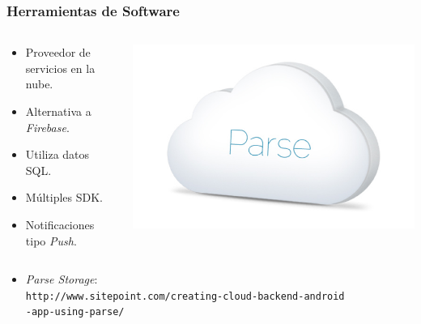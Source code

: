\begin{frame}
	\frametitle{Herramientas de Software}
	\begin{columns}
		\begin{column}{0.6\textwidth}
			\begin{itemize}
				\item Proveedor de servicios en la nube.
				\item Alternativa a {\it Firebase}.
				\item Utiliza datos SQL.
				\item Múltiples SDK.
				\item Notificaciones tipo {\it Push}.
			\end{itemize}
			\endblock{}
		\end{column}
		\begin{column}{0.4\textwidth}
			\vfill 
			\begin{center}
				\includegraphics[width=0.9\linewidth]{Images/logos/parse_logo}
			\end{center}
		\end{column}
	\end{columns}
		\begin{itemize}
			\item {\it Parse Storage}:\\ {\texttt{http://www.sitepoint.com/creating-cloud-backend-android\\-app-using-parse/}}
		\end{itemize}
	\endblock{}
\end{frame}